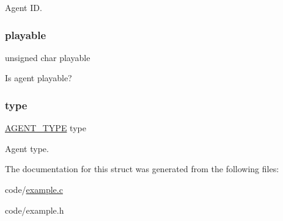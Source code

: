 Agent ID. \mbox{\label{struct_a_g_e_n_t_a63b583a476b62c88c27c5cfc6ee64e41}} 
\subsubsection{\texorpdfstring{playable}{playable}}
{\footnotesize\ttfamily unsigned char playable}

Is agent playable? \mbox{\label{struct_a_g_e_n_t_aa67ea80f7f0c5d71eaa7fe3ce7d31cc9}} 
\subsubsection{\texorpdfstring{type}{type}}
{\footnotesize\ttfamily \mbox{\hyperlink{showworld_8h_a24d5ee52bdf31f4727c9b550d6e361ae}{A\+G\+E\+N\+T\+\_\+\+T\+Y\+PE}} type}

Agent type. 

The documentation for this struct was generated from the following files\+:\begin{DoxyCompactItemize}
\item 
code/\mbox{\hyperlink{example_8c}{example.\+c}}\item 
code/example.\+h\end{DoxyCompactItemize}
